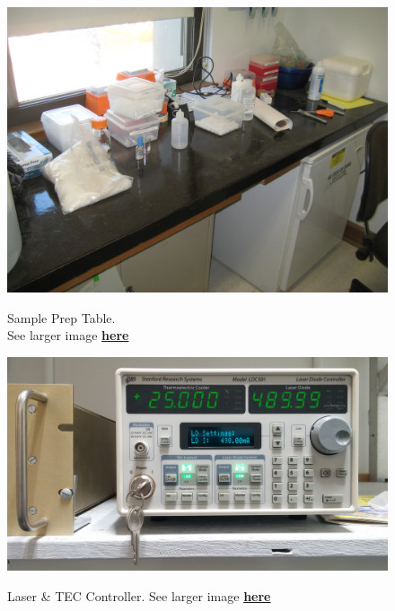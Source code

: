 \documentclass{../lab}
\begin{document}
\begin{figure}[h]
\begin{minipage}{0.3\textwidth}
    \href{http://experimentationlab.berkeley.edu/sites/default/files/images/OTZ_Table_3555.jpg}{\includegraphics[width=\linewidth,keepaspectratio]{images/OTZ_Table_3555.jpg}}
    \caption{Sample Prep Table. \\ See larger image \href{http://experimentationlab.berkeley.edu/sites/default/files/images/OTZ_Table_3555.jpg}{\textbf{here}}}
\end{minipage}
\begin{minipage}{0.38\textwidth}
    \href{http://experimentationlab.berkeley.edu/sites/default/files/0628171211\%5B1\%5D.jpg}{\includegraphics[width=\linewidth,keepaspectratio]{images/0628171211[1].jpg}}
    \caption{Laser \& TEC Controller. See larger image \href{http://experimentationlab.berkeley.edu/sites/default/files/0628171211\%5B1\%5D.jpg}{\textbf{here}}}

\end{minipage}
\end{figure}
\end{document}
